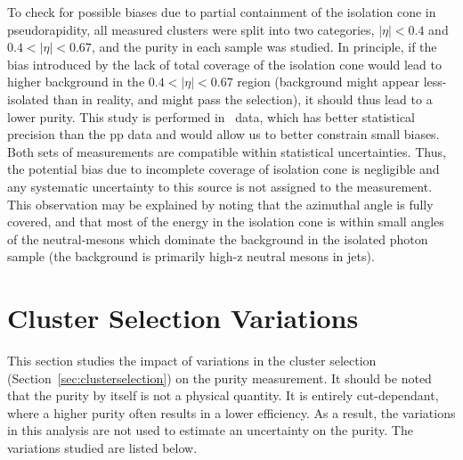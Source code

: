 To check for possible biases due to partial containment of the isolation cone in pseudorapidity, all measured clusters were split into two categories, $|\eta|<0.4$ and $0.4<|\eta|<0.67$, and the purity in each sample was studied. In principle, if the bias introduced by the lack of total coverage of the isolation cone would lead to higher background in the $0.4<|\eta|<0.67$ region (background might appear less-isolated than in reality, and might pass the selection), it should thus lead to a lower purity. This study is performed in \pPb~data, which has better statistical precision than the pp data and would allow us to better constrain small biases. Both sets of measurements are compatible within statistical uncertainties. Thus, the potential bias due to incomplete coverage of isolation cone is negligible and any systematic uncertainty to this source is not assigned to the measurement. This observation may be explained by noting that the azimuthal angle is fully covered, and that most of the energy in the isolation cone is within small angles of the neutral-mesons which dominate the background in the isolated photon sample (the background is primarily high-z neutral mesons in jets). 

\section{Cluster Selection Variations}
\label{sec:clustercutselectionvariation}
This section studies the impact of variations in the cluster selection (Section~\ref{sec:clusterselection}) on the purity measurement. It should be noted that the purity by itself is not a physical quantity. It is entirely cut-dependant, where a higher purity often results in a lower efficiency. As a result, the variations in this analysis are not used to estimate an uncertainty on the purity. The variations studied are listed below.

